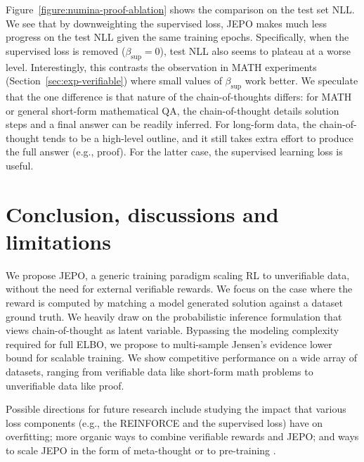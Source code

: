 \documentclass{article}
\theoremstyle{definition}
\begin{document}
Figure~\ref{figure:numina-proof-ablation} shows the comparison on the test set NLL. We see that by downweighting the supervised loss, JEPO makes much less progress on the test NLL given the same training epochs. Specifically, when the supervised loss is removed ($\beta_\text{sup}=0$), test NLL also seems to plateau at a worse level. Interestingly, this contrasts the observation in MATH experiments (Section~\ref{sec:exp-verifiable}) where small values of $\beta_\text{sup}$ work better. We speculate that the one difference is that nature of the chain-of-thoughts differs: for MATH or general short-form mathematical QA, the chain-of-thought details solution steps and a final answer can be readily inferred. For long-form data, the chain-of-thought tends to be a high-level outline, and it still takes extra effort to produce the full answer (e.g., proof). For the latter case, the supervised learning loss is useful.

\section{Conclusion, discussions and limitations}

We propose JEPO, a generic training paradigm scaling RL to unverifiable data, without the need for external verifiable rewards. We focus on the case where the reward is computed by matching a model generated solution 
against a dataset ground truth. We heavily draw on the probabilistic inference formulation that views chain-of-thought as latent variable. Bypassing the modeling complexity required for full ELBO, we  propose to multi-sample Jensen's evidence lower bound for scalable training. We show competitive performance on a wide array of datasets, ranging from verifiable  data like short-form math problems to unverifiable data like proof.

Possible directions for future research include studying the impact that various loss components (e.g., the REINFORCE and the supervised loss) have on overfitting; more organic ways to combine verifiable rewards and JEPO; and ways to scale JEPO in the form of meta-thought \citep{jaech2024openai,xiang2025towards} or to pre-training \citep{ruan2025reasoning}.





\clearpage
\onecolumn
\end{document}
